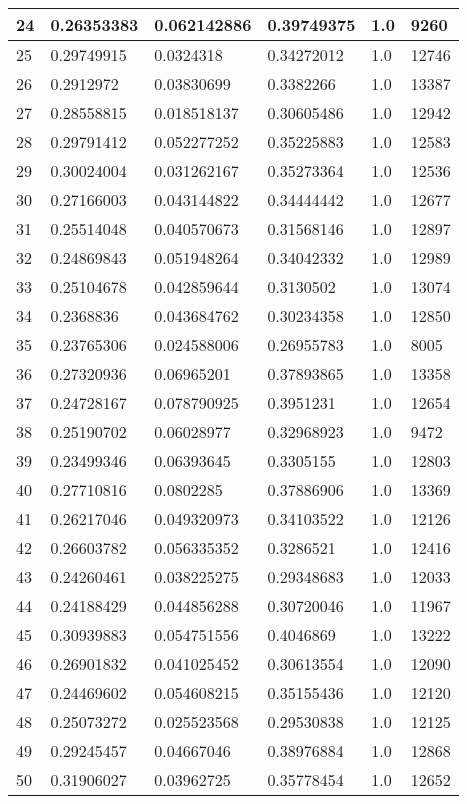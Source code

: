\begin{longtable}{|l|l|l|l|l|l|}
24 & 0.26353383 & 0.062142886 & 0.39749375 & 1.0 & 9260 \\ \hline 
25 & 0.29749915 & 0.0324318 & 0.34272012 & 1.0 & 12746 \\ \hline 
26 & 0.2912972 & 0.03830699 & 0.3382266 & 1.0 & 13387 \\ \hline 
27 & 0.28558815 & 0.018518137 & 0.30605486 & 1.0 & 12942 \\ \hline 
28 & 0.29791412 & 0.052277252 & 0.35225883 & 1.0 & 12583 \\ \hline 
29 & 0.30024004 & 0.031262167 & 0.35273364 & 1.0 & 12536 \\ \hline 
30 & 0.27166003 & 0.043144822 & 0.34444442 & 1.0 & 12677 \\ \hline 
31 & 0.25514048 & 0.040570673 & 0.31568146 & 1.0 & 12897 \\ \hline 
32 & 0.24869843 & 0.051948264 & 0.34042332 & 1.0 & 12989 \\ \hline 
33 & 0.25104678 & 0.042859644 & 0.3130502 & 1.0 & 13074 \\ \hline 
34 & 0.2368836 & 0.043684762 & 0.30234358 & 1.0 & 12850 \\ \hline 
35 & 0.23765306 & 0.024588006 & 0.26955783 & 1.0 & 8005 \\ \hline 
36 & 0.27320936 & 0.06965201 & 0.37893865 & 1.0 & 13358 \\ \hline 
37 & 0.24728167 & 0.078790925 & 0.3951231 & 1.0 & 12654 \\ \hline 
38 & 0.25190702 & 0.06028977 & 0.32968923 & 1.0 & 9472 \\ \hline 
39 & 0.23499346 & 0.06393645 & 0.3305155 & 1.0 & 12803 \\ \hline 
40 & 0.27710816 & 0.0802285 & 0.37886906 & 1.0 & 13369 \\ \hline 
41 & 0.26217046 & 0.049320973 & 0.34103522 & 1.0 & 12126 \\ \hline 
42 & 0.26603782 & 0.056335352 & 0.3286521 & 1.0 & 12416 \\ \hline 
43 & 0.24260461 & 0.038225275 & 0.29348683 & 1.0 & 12033 \\ \hline 
44 & 0.24188429 & 0.044856288 & 0.30720046 & 1.0 & 11967 \\ \hline 
45 & 0.30939883 & 0.054751556 & 0.4046869 & 1.0 & 13222 \\ \hline 
46 & 0.26901832 & 0.041025452 & 0.30613554 & 1.0 & 12090 \\ \hline 
47 & 0.24469602 & 0.054608215 & 0.35155436 & 1.0 & 12120 \\ \hline 
48 & 0.25073272 & 0.025523568 & 0.29530838 & 1.0 & 12125 \\ \hline 
49 & 0.29245457 & 0.04667046 & 0.38976884 & 1.0 & 12868 \\ \hline 
50 & 0.31906027 & 0.03962725 & 0.35778454 & 1.0 & 12652 \\ \hline 
\end{longtable}